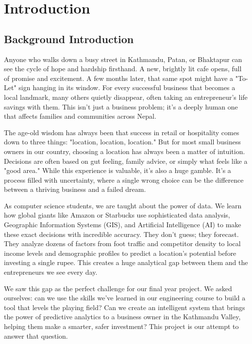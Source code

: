 \chapter{Introduction}
\section{Background Introduction}

Anyone who walks down a busy street in Kathmandu, Patan, or Bhaktapur can see the cycle of hope and hardship firsthand. A new, brightly lit cafe opens, full of promise and excitement. A few months later, that same spot might have a "To-Let" sign hanging in its window. For every successful business that becomes a local landmark, many others quietly disappear, often taking an entrepreneur's life savings with them. This isn't just a business problem; it's a deeply human one that affects families and communities across Nepal.

The age-old wisdom has always been that success in retail or hospitality comes down to three things: "location, location, location." But for most small business owners in our country, choosing a location has always been a matter of intuition. Decisions are often based on gut feeling, family advice, or simply what feels like a "good area." While this experience is valuable, it's also a huge gamble. It's a process filled with uncertainty, where a single wrong choice can be the difference between a thriving business and a failed dream.

As computer science students, we are taught about the power of data. We learn how global giants like Amazon or Starbucks use sophisticated data analysis, Geographic Information Systems (GIS), and Artificial Intelligence (AI) to make these exact decisions with incredible accuracy. They don't guess; they forecast. They analyze dozens of factors  from foot traffic and competitor density to local income levels and demographic profiles  to predict a location's potential before investing a single rupee. This creates a huge analytical gap between them and the entrepreneurs we see every day.

We saw this gap as the perfect challenge for our final year project. We asked ourselves: can we use the skills we've learned in our engineering course to build a tool that levels the playing field? Can we create an intelligent system that brings the power of predictive analytics to a business owner in the Kathmandu Valley, helping them make a smarter, safer investment? This project is our attempt to answer that question.


